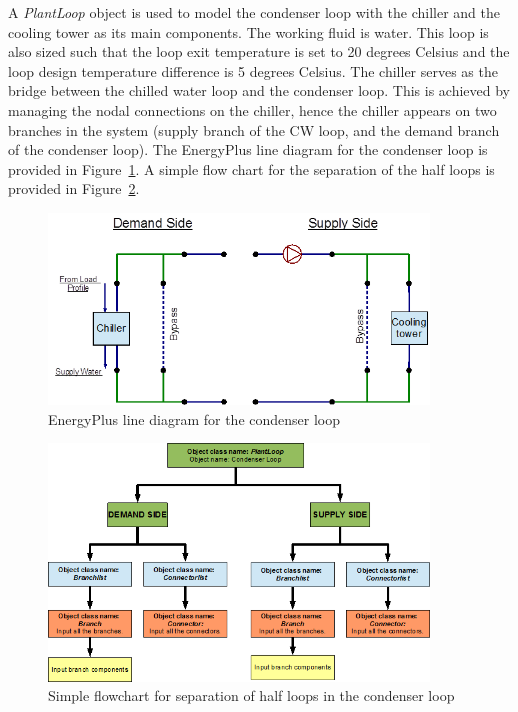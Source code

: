 A \emph{PlantLoop} object is used to model the condenser loop with the chiller and the cooling tower as its main components. The working fluid is water. This loop is also sized such that the loop exit temperature is set to 20 degrees Celsius and the loop design temperature difference is 5 degrees Celsius. The chiller serves as the bridge between the chilled water loop and the condenser loop. This is achieved by managing the nodal connections on the chiller, hence the chiller appears on two branches in the system (supply branch of the CW loop, and the demand branch of the condenser loop). The EnergyPlus line diagram for the condenser loop is provided in Figure~\ref{fig:energyplus-line-diagram-for-the-condenser-002}. A simple flow chart for the separation of the half loops is provided in Figure~\ref{fig:simple-flowchart-for-separation-of-half-loops-001}.

\begin{figure}[hbtp] %
\centering
\includegraphics[width=0.9\textwidth, height=0.9\textheight, keepaspectratio=true]{media/image029.png}
\caption{EnergyPlus line diagram for the condenser loop \protect \label{fig:energyplus-line-diagram-for-the-condenser-002}}
\end{figure}

\begin{figure}[hbtp] %
\centering
\includegraphics[width=0.9\textwidth, height=0.9\textheight, keepaspectratio=true]{media/image030.png}
\caption{Simple flowchart for separation of half loops in the condenser loop \protect \label{fig:simple-flowchart-for-separation-of-half-loops-001}}
\end{figure}

